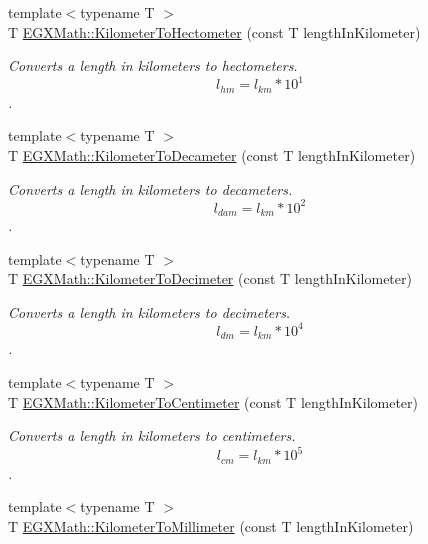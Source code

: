 \begin{DoxyCompactItemize}
{\footnotesize template$<$typename T $>$ }\\T \mbox{\hyperlink{group___e_g_x_math-_conversions-_length_conversions-_s_i-_kilometer-_s_i_ga43aeeda4346af2ec10e749d076d38bc3}{E\+G\+X\+Math\+::\+Kilometer\+To\+Hectometer}} (const T length\+In\+Kilometer)
\begin{DoxyCompactList}\small\item\em Converts a length in kilometers to hectometers. \[ l_{hm}=l_{km} * 10^{1} \]. \end{DoxyCompactList}\item 
{\footnotesize template$<$typename T $>$ }\\T \mbox{\hyperlink{group___e_g_x_math-_conversions-_length_conversions-_s_i-_kilometer-_s_i_ga040acc3477237c471c0336e5b44d4654}{E\+G\+X\+Math\+::\+Kilometer\+To\+Decameter}} (const T length\+In\+Kilometer)
\begin{DoxyCompactList}\small\item\em Converts a length in kilometers to decameters. \[ l_{dam}=l_{km} * 10^{2} \]. \end{DoxyCompactList}\item 
{\footnotesize template$<$typename T $>$ }\\T \mbox{\hyperlink{group___e_g_x_math-_conversions-_length_conversions-_s_i-_kilometer-_s_i_ga6b9e471fb53794741dcf3859d316b1c1}{E\+G\+X\+Math\+::\+Kilometer\+To\+Decimeter}} (const T length\+In\+Kilometer)
\begin{DoxyCompactList}\small\item\em Converts a length in kilometers to decimeters. \[ l_{dm}=l_{km} * 10^{4} \]. \end{DoxyCompactList}\item 
{\footnotesize template$<$typename T $>$ }\\T \mbox{\hyperlink{group___e_g_x_math-_conversions-_length_conversions-_s_i-_kilometer-_s_i_ga1d5cac5eab11ffbf7b839180813343d0}{E\+G\+X\+Math\+::\+Kilometer\+To\+Centimeter}} (const T length\+In\+Kilometer)
\begin{DoxyCompactList}\small\item\em Converts a length in kilometers to centimeters. \[ l_{cm}=l_{km} * 10^{5} \]. \end{DoxyCompactList}\item 
{\footnotesize template$<$typename T $>$ }\\T \mbox{\hyperlink{group___e_g_x_math-_conversions-_length_conversions-_s_i-_kilometer-_s_i_ga109bb9ca348173d3bfd643a4e3bd3686}{E\+G\+X\+Math\+::\+Kilometer\+To\+Millimeter}} (const T length\+In\+Kilometer)

\end{DoxyCompactItemize}
